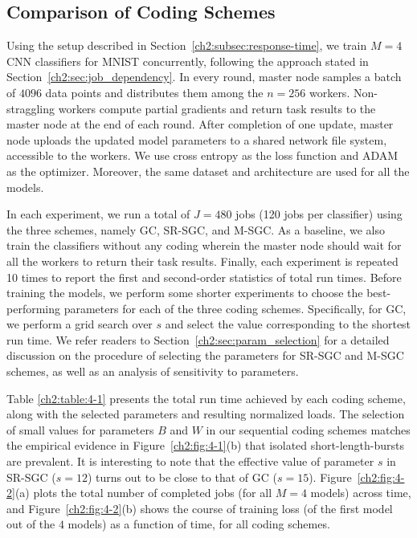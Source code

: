 \FloatBarrier

\subsection{Comparison of Coding Schemes} \label{ch2:subsec:comp}
Using the setup described in Section~\ref{ch2:subsec:response-time}, we train $M=4$ CNN classifiers for MNIST concurrently, following the approach stated in Section~\ref{ch2:sec:job_dependency}. In every round, master node samples a batch of $4096$ data points and distributes them among the $n=256$ workers. Non-straggling workers compute partial gradients and return task results to the master node at the end of each round. After completion of one update, master node uploads the updated model parameters to a shared network file system, accessible to the workers.  We use cross entropy as the loss function and ADAM \cite{kingma2014adam} as the optimizer. Moreover, the same dataset and architecture are used for all the models.

In each experiment, we run a total of $J=480$ jobs (120 jobs per classifier) using the three schemes, namely GC, SR-SGC, and M-SGC. As a baseline, we also train the classifiers without any coding wherein the master node should wait for all the workers to return their task results. Finally, each experiment is repeated 10 times to report the first and second-order statistics of total run times. Before training the models, we perform some shorter experiments to choose the best-performing parameters for each of the three coding schemes. Specifically, for GC, we perform a grid search over $s$ and select the value corresponding to the shortest run time.
{We refer readers to Section~\ref{ch2:sec:param_selection} for a detailed discussion on the procedure of selecting the parameters for SR-SGC and M-SGC schemes, as well as an analysis of sensitivity to parameters.}

Table \ref{ch2:table:4-1} presents the total run time achieved by each coding scheme, along with the selected parameters and resulting normalized loads.
The selection of small values for parameters $B$ and $W$ in our sequential coding schemes matches the empirical evidence in Figure~\ref{ch2:fig:4-1}(b) that isolated short-length-bursts are prevalent. It is interesting to note that the effective value of parameter $s$ in SR-SGC ($s=12$) turns out to be close to that of GC ($s=15$).  Figure~\ref{ch2:fig:4-2}(a) plots the total number of completed jobs (for all $M=4$ models) across time, and Figure~\ref{ch2:fig:4-2}(b) shows the course of training loss (of the first model out of the $4$ models) as a function of time, for all coding schemes. 


